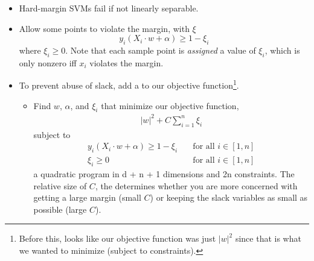 \documentclass[12pt]{article}
\begin{document}
\begin{itemize}
	\item Hard-margin SVMs fail if not linearly separable.
	\item {} Allow some points to violate the margin, with  $\xi$
	\begin{equation}
	y_i (X_i \cdot w + \alpha) \ge 1 - \xi_i
	\end{equation}
	where $\xi_i \ge 0$. Note that each sample point is \emph{assigned} a value of $\xi_i$, which is only nonzero iff $x_i$ violates the margin.
	\item To prevent abuse of slack, add a \textbf{} to our objective function\footnote{Before this, looks like our objective function was just $|w|^2$ since that is what we wanted to minimize (subject to constraints).}.
	\begin{itemize}
		\item Find $w$, $\alpha$, and $\xi_i$ that minimize our objective function,
		\begin{align}
		|w|^2 + C \sum_{i = 1}^n \xi_i
		\end{align}
		subject to
		\begin{align}
		y_i (X_i \cdot w + \alpha) \ge 1 - \xi_i \quad &\text{for all } i \in [1,n] \\
		\xi_i \ge 0 \quad &\text{for all } i \in [1,n]
		\end{align}
		a quadratic program in d + n + 1 dimensions and 2n constraints. The relative size of $C$, the  determines whether you are more concerned with getting a large margin (small $C$) or keeping the slack variables as small as possible (large $C$).
	\end{itemize}
\end{itemize}

\end{document}
